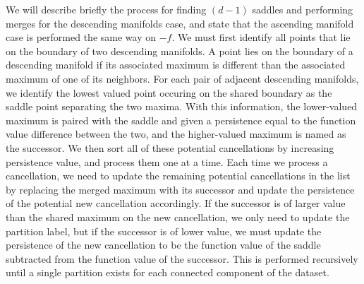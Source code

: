 We will describe briefly the process for finding $(d-1)$ saddles and performing merges for the descending manifolds case, and state that the ascending manifold case is performed the same way on $-f$.
%
We must first identify all points that lie on the boundary of two descending manifolds.
%
A point lies on the boundary of a descending manifold if its associated maximum is different than the associated maximum of one of its neighbors.
%
For each pair of adjacent descending manifolds, we identify the lowest valued point occuring on the shared boundary as the saddle point separating the two maxima.
%
With this information, the lower-valued maximum is paired with the saddle and given a persistence equal to the function value difference between the two, and the higher-valued maximum is named as the successor.
%
We then sort all of these potential cancellations by increasing persistence value, and process them one at a time.
%
Each time we process a cancellation, we need to update the remaining potential cancellations in the list by replacing the merged maximum with its successor and update the persistence of the potential new cancellation accordingly.
%
If the successor is of larger value than the shared maximum on the new
cancellation, we only need to update the partition label, but if the successor is of lower value, we must update the persistence of the new cancellation to be the function value of the saddle subtracted from the function value of the successor.
%
This is performed recursively until a single partition exists for each connected component of the dataset.


